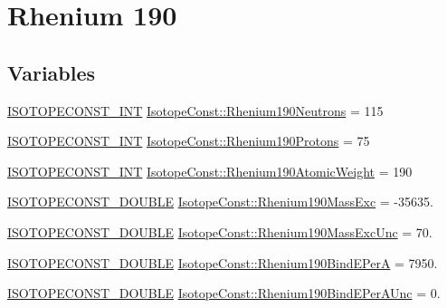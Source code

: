 \hypertarget{group___isotope_const-_rhenium-_re190}{}\section{Rhenium 190}
\label{group___isotope_const-_rhenium-_re190}
\subsection*{Variables}
\begin{DoxyCompactItemize}
\item 
\mbox{\hyperlink{group___isotope_const-_macros_ga5f18360b3e99483a35c32d789e62621c}{I\+S\+O\+T\+O\+P\+E\+C\+O\+N\+S\+T\+\_\+\+I\+NT}} \mbox{\hyperlink{group___isotope_const-_rhenium-_re190_ga5b77363aaf57f4f7fa3b2ee2f8d227ae}{Isotope\+Const\+::\+Rhenium190\+Neutrons}} = 115
\item 
\mbox{\hyperlink{group___isotope_const-_macros_ga5f18360b3e99483a35c32d789e62621c}{I\+S\+O\+T\+O\+P\+E\+C\+O\+N\+S\+T\+\_\+\+I\+NT}} \mbox{\hyperlink{group___isotope_const-_rhenium-_re190_ga1dc861d52c5c6a89d4ef890e32af6dec}{Isotope\+Const\+::\+Rhenium190\+Protons}} = 75
\item 
\mbox{\hyperlink{group___isotope_const-_macros_ga5f18360b3e99483a35c32d789e62621c}{I\+S\+O\+T\+O\+P\+E\+C\+O\+N\+S\+T\+\_\+\+I\+NT}} \mbox{\hyperlink{group___isotope_const-_rhenium-_re190_gae73841f8eacc8e5532abce9079b28731}{Isotope\+Const\+::\+Rhenium190\+Atomic\+Weight}} = 190
\item 
\mbox{\hyperlink{group___isotope_const-_macros_ga8f45a7272ce02c0b4c65c44636ed719a}{I\+S\+O\+T\+O\+P\+E\+C\+O\+N\+S\+T\+\_\+\+D\+O\+U\+B\+LE}} \mbox{\hyperlink{group___isotope_const-_rhenium-_re190_ga0d93088b92d65be303d80c90a56dbc31}{Isotope\+Const\+::\+Rhenium190\+Mass\+Exc}} = -\/35635.
\item 
\mbox{\hyperlink{group___isotope_const-_macros_ga8f45a7272ce02c0b4c65c44636ed719a}{I\+S\+O\+T\+O\+P\+E\+C\+O\+N\+S\+T\+\_\+\+D\+O\+U\+B\+LE}} \mbox{\hyperlink{group___isotope_const-_rhenium-_re190_ga3b90e069a9ddbacf4e380375c55006fd}{Isotope\+Const\+::\+Rhenium190\+Mass\+Exc\+Unc}} = 70.
\item 
\mbox{\hyperlink{group___isotope_const-_macros_ga8f45a7272ce02c0b4c65c44636ed719a}{I\+S\+O\+T\+O\+P\+E\+C\+O\+N\+S\+T\+\_\+\+D\+O\+U\+B\+LE}} \mbox{\hyperlink{group___isotope_const-_rhenium-_re190_gaac5ce78faa320b0c475cad5b7fa6bf5e}{Isotope\+Const\+::\+Rhenium190\+Bind\+E\+PerA}} = 7950.
\item 
\mbox{\hyperlink{group___isotope_const-_macros_ga8f45a7272ce02c0b4c65c44636ed719a}{I\+S\+O\+T\+O\+P\+E\+C\+O\+N\+S\+T\+\_\+\+D\+O\+U\+B\+LE}} \mbox{\hyperlink{group___isotope_const-_rhenium-_re190_gad1a2c6887666a49f5b2444848bfdc8af}{Isotope\+Const\+::\+Rhenium190\+Bind\+E\+Per\+A\+Unc}} = 0.

\end{DoxyCompactItemize}
